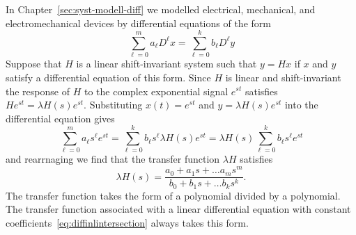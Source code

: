In Chapter~\ref{sec:syst-modell-diff} we modelled electrical, mechanical, and electromechanical devices by differential equations of the form
\begin{equation}\label{eq:diffinlintersection}
\sum_{\ell=0}^{m} a_\ell D^\ell x = \sum_{\ell=0}^{k} b_\ell D^\ell y
\end{equation}
Suppose that $H$ is a linear shift-invariant system such that $y = Hx$ if $x$ and $y$ satisfy a differential equation of this form.  Since $H$ is linear and shift-invariant the response of $H$ to the complex exponential signal $e^{st}$ satisfies $He^{st} = \lambda H(s) e^{st}$.  Substituting $x(t) = e^{st}$ and $y = \lambda H(s) e^{st}$ into the differential equation gives
\[
\sum_{\ell=0}^{m} a_\ell s^{\ell} e^{st} = \sum_{\ell=0}^{k} b_\ell s^{\ell} \lambda H(s) e^{st} = \lambda H(s) \sum_{\ell=0}^{k} b_\ell s^{\ell} e^{st}
\]
and rearrnaging we find that the transfer function $\lambda H$ satisfies
\begin{equation} \label{eq:findtransferfuncfromdiff}
\lambda H(s) = \frac{a_0 + a_1s + \dots a_m s^m}{b_0 + b_1s + \dots b_k s^k}.
\end{equation}
The transfer function takes the form of a polynomial divided by a polynomial.  The transfer function associated with a linear differential equation with constant coefficients~\eqref{eq:diffinlintersection} always takes this form.  



